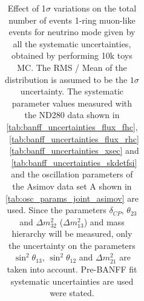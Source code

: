 \begin{table}[htb]
\begin{tabular}{| c | c | c |}
\end{tabular}
\caption{
 Effect of 1$\sigma$ variations on the total number of events 1-ring muon-like events for neutrino mode
 given by all the systematic uncertainties, obtained by performing 10k toys MC.
The RMS / Mean of the distribution is assumed to be the $1\sigma$ uncertainty.
The systematic parameter values measured with the ND280 data 
shown in 
\cref{tab:banff_uncertainties_flux_fhc},
~\ref{tab:banff_uncertainties_flux_rhc}
~\ref{tab:banff_uncertainties_xsec}
and
~\ref{tab:banff_uncertainties_skdetfsi}
and the oscillation parameters of the Asimov data set A shown in \cref{tab:osc_params_joint_asimov}
are used.
Since the parameters $\delta_{CP}$, $\theta_{23}$ and $\Delta m^2_{32}$ ($\Delta m^2_{13}$) and mass hierarchy
will be measured,
only the uncertainty on the parameters 
$\sin^2 \theta_{13}$,
$\sin^2 \theta_{12}$
and 
$\Delta m^2_{21}$ 
are taken into account.
Pre-BANFF fit systematic uncertainties are used were stated.
}                                                                                                                                                                                          
\label{tab:nsk_systematic_table_summary_joint_asimov_A_fhc_mulike}
\end{table}






